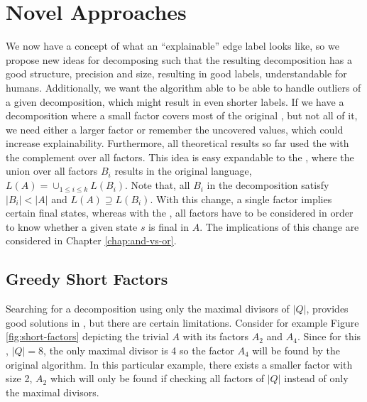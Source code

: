 \chapter{Novel Approaches}
\label{chap:novel-algos}
We now have a concept of what an \enquote{explainable} edge label looks like, so we propose new ideas for decomposing \DFAs such that the resulting decomposition has a good structure, precision and size, resulting in good labels, understandable for humans. Additionally, we want the algorithm able to be able to handle outliers of a given decomposition, which might result in even shorter labels. If we have a decomposition where a small factor covers most of the original \DFA, but not all of it, we need either a larger factor or remember the uncovered values, which could increase explainability. Furthermore, all theoretical results so far used the \andDecomp with the complement over all factors. This idea is easy expandable to the \orDecomp, where the union over all factors $B_i$ results in the original language, $L(A) = \cup_{1\leq i \leq k} L(B_i)$. Note that, all $B_i$ in the decomposition satisfy $|B_i| < |A|$ and $L(A) \supseteq L(B_i)$. With this change, a single factor implies certain final states, whereas with the \andDecomp, all factors have to be considered in order to know whether a given state $s$ is final in $A$. The implications of this change are considered in Chapter \ref{chap:and-vs-or}.

\section{Greedy Short Factors}
\label{ch:novel-algos:greedy-short-factors}
Searching for a decomposition using only the maximal divisors of $|Q|$, provides good solutions in \LogSpace, but there are certain limitations. Consider for example Figure \ref{fig:short-factors} depicting the trivial \DFA $A$ with its factors $A_2$ and $A_4$. Since for this \DFA, $|Q| = 8$, the only maximal divisor is 4 so the factor $A_4$ will be found by the original algorithm. In this particular example, there exists a smaller factor with size 2, $A_2$ which will only be found if checking all factors of $|Q|$ instead of only the maximal divisors.

